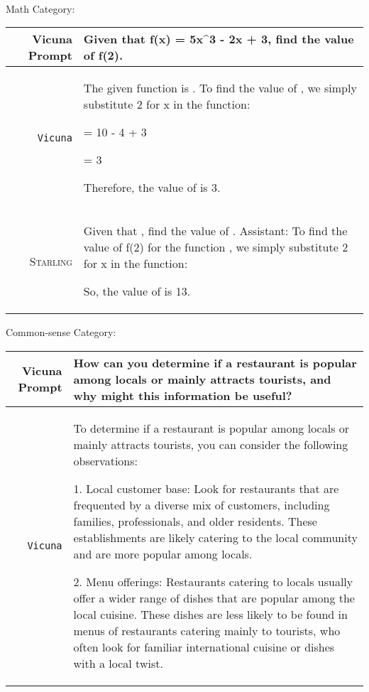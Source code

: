 \documentclass{article}
\newlength\mydepth
\newcommand{\starlingemojititle}{\textsc{Starling}\raisebox{-\mydepth}{\texttt{[image: images/starling-final.png]}}}
\begin{document}
{\ \newline
\ \newline
\ \newline

Math Category:

{  \footnotesize \begin{tabularx}{\linewidth}{r X} \toprule Vicuna Prompt  & {\bf Given that f(x) = 5x\^{}3 - 2x + 3, find the value of f(2).}
\\
 \midrule \texttt{Vicuna}  &
 The given function is . To find the value of , we simply substitute 2 for x in the function:



= 10 - 4 + 3

= 3

Therefore, the value of  is 3.
\\
 \midrule \starlingemojititle{}  &
 Given that , find the value of .
Assistant: To find the value of f(2) for the function , we simply substitute 2 for x in the function:







So, the value of  is 13. \\
 \bottomrule
 \end{tabularx}}

\newpage

Common-sense Category:

{  \footnotesize \begin{tabularx}{\linewidth}{r X} \toprule Vicuna Prompt  & {\bf How can you determine if a restaurant is popular among locals or mainly attracts tourists, and why might this information be useful?}
\\
 \midrule \texttt{Vicuna}  &
To determine if a restaurant is popular among locals or mainly attracts tourists, you can consider the following observations:

1. Local customer base: Look for restaurants that are frequented by a diverse mix of customers, including families, professionals, and older residents. These establishments are likely catering to the local community and are more popular among locals.

2. Menu offerings: Restaurants catering to locals usually offer a wider range of dishes that are popular among the local cuisine. These dishes are less likely to be found in menus of restaurants catering mainly to tourists, who often look for familiar international cuisine or dishes with a local twist.


\end{tabularx}}}
\end{document}
